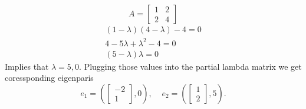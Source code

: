 \documentclass[letter]{article}
\newenvironment{menumerate}{\edef\backupindent{\the\parindent}
  \enumerate\setlength{\parindent}{\backupindent}}
  {\endenumerate}
\begin{document}
\begin{menumerate}
\begin{menumerate}
        \item
        \begin{equation*}
        A =
            \begin{bmatrix}
                1&2\\
                2&4
            \end{bmatrix}
        \end{equation*}
        \begin{equation*}
                 \begin{aligned}
                     (1 - \lambda)(4 - \lambda) -4 = 0 \\
                    4 - 5\lambda + \lambda^2 -4 = 0 \\
                     (5 - \lambda)\lambda = 0
                 \end{aligned}
        \end{equation*}
        Implies that $\lambda = 5,0$.
             Plugging those values into the partial lambda matrix we get
             coressponding eigenparis
             \begin{equation*}
                 e_1 = \left(\begin{bmatrix}
                     -2 \\ 1
                 \end{bmatrix}, 0\right),
                 \;\;\;\;
                 e_2 = \left(\begin{bmatrix}
                     1 \\ 2
                 \end{bmatrix}
                 , 5\right).
        \end{equation*}


\end{menumerate}
\end{menumerate}
\end{document}

